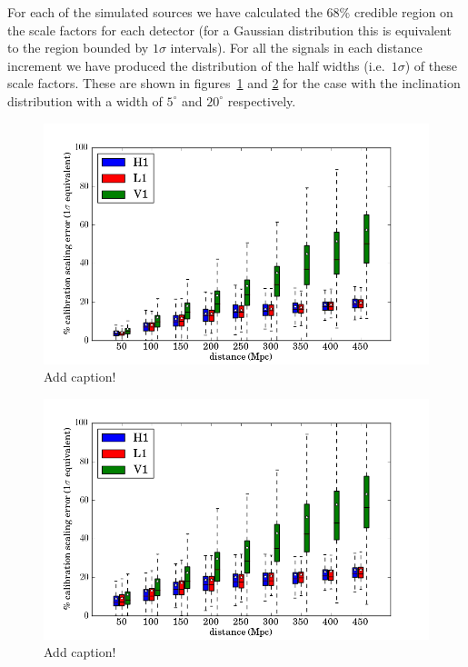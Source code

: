 \documentclass[10pt]{iopart}
\begin{document}
For each of the simulated sources we have calculated the 68\% credible region on the scale factors 
for each detector (for a Gaussian distribution this is equivalent to the region bounded by 
$1\sigma$ intervals). For all the signals in each distance increment we have produced the 
distribution of the half widths (i.e.\ $1\sigma$) of these scale factors. These are shown in 
figures~\ref{fig:narrowdist} and \ref{fig:widedist} for the case with the inclination distribution 
with a width of $5^{\circ}$ and $20^{\circ}$ respectively.

\begin{figure}
 \begin{center}
  \includegraphics[width=1.0\textwidth]{scale_factors_5degs_boxplot.png}
 \end{center}
 \caption{\label{fig:narrowdist} Add caption!}
\end{figure}

\begin{figure}
 \begin{center}
  \includegraphics[width=1.0\textwidth]{scale_factors_20degs_boxplot.png}
 \end{center}
 \caption{\label{fig:widedist} Add caption!}
\end{figure}
\end{document}
